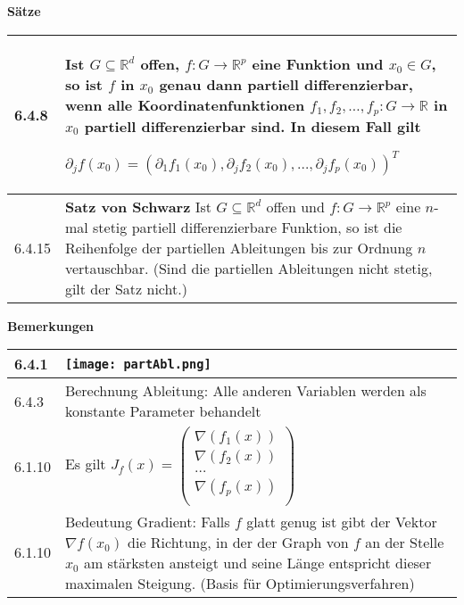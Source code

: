    \noindent 
    \textbf{Sätze}
    \begin{table}[H]
    \begin{tabularx}{\textwidth}{X m{16cm}}
        \toprule

        6.4.8 & Ist $G \subseteq \mathbb{R}^d$ offen, $f: G \rightarrow \mathbb{R}^p$ eine Funktion und $x_0 \in G$, so ist $f$ in $x_0$
                genau dann partiell differenzierbar, wenn alle Koordinatenfunktionen $f_1, f_2, \dots, f_p : G\rightarrow \mathbb{R}$ in $x_0$
                partiell differenzierbar sind. In diesem Fall gilt \hfill \break
                \centerline{$ \partial_j f(x_0) = (\partial_1 f_1(x_0), \partial_j f_2(x_0), \dots, \partial_j f_p(x_0) )^T$} \\
        \midrule
        6.4.15& \textbf{Satz von Schwarz} \hfill \break
                Ist $G \subseteq \mathbb{R}^d$ offen und $f: G \rightarrow \mathbb{R}^p$ eine $n$-mal stetig partiell differenzierbare Funktion,
                so ist die Reihenfolge der partiellen Ableitungen bis zur Ordnung $n$ vertauschbar. \hfill \break
                (Sind die partiellen Ableitungen nicht stetig, gilt der Satz nicht.)\\ 

        \bottomrule
    \end{tabularx}
    \end{table}

    \noindent
    \textbf{Bemerkungen}
    \begin{table}[H]
    \begin{tabularx}{\textwidth}{X m{16cm}}
        \toprule

        6.4.1 & \texttt{[image: partAbl.png]} \\
        \midrule
        6.4.3 & Berechnung Ableitung: Alle anderen Variablen werden als konstante Parameter behandelt \\
        \midrule
        6.1.10& Es gilt $J_f(x)=    \begin{pmatrix}
                                    \nabla(f_1(x)) \\
                                    \nabla(f_2(x)) \\
                                    \dots \\
                                    \nabla(f_p(x)) \\
                                    \end{pmatrix}$ \\
        \midrule
        6.1.10& Bedeutung Gradient: Falls $f$ glatt genug ist gibt der Vektor $\nabla f(x_0)$ die Richtung, in der der Graph von $f$ an der Stelle
                $x_0$ am stärksten ansteigt und seine Länge entspricht dieser maximalen Steigung. (Basis für Optimierungsverfahren) \\

        \bottomrule
    \end{tabularx}
    \end{table}

